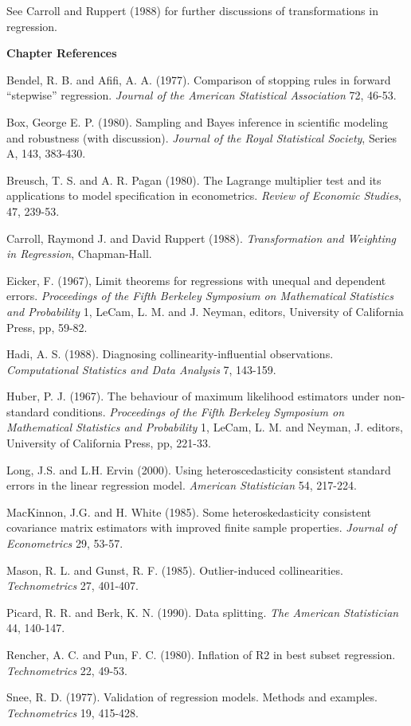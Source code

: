 See Carroll and Ruppert (1988) for further discussions of
transformations in regression.

\bigskip

\textbf{Chapter References}
\begin{multicols}{2}

Bendel, R. B. and Afifi, A. A. (1977). Comparison of stopping rules
in forward ``stepwise'' regression. \textit{Journal of the American
Statistical Association} 72, 46-53.

Box, George E. P. (1980). Sampling and Bayes inference in scientific
modeling and robustness (with discussion). \textit{Journal of the
Royal Statistical Society}, Series A, 143, 383-430.

Breusch, T. S. and A. R. Pagan (1980).  The Lagrange multiplier test
and its applications to model specification in econometrics.
\textit{Review of Economic Studies}, 47, 239-53.

Carroll, Raymond J. and David Ruppert (1988). \textit{Transformation
and Weighting in Regression}, Chapman-Hall.

Eicker, F. (1967), Limit theorems for regressions with unequal and
dependent errors.  \textit{Proceedings of the Fifth Berkeley
Symposium on Mathematical Statistics and Probability} 1, LeCam, L.
M. and J. Neyman, editors, University of California Press, pp,
59-82.

Hadi, A. S. (1988). Diagnosing collinearity-influential
observations. \textit{Computational Statistics and Data Analysis} 7,
143-159.

Huber, P. J. (1967). The behaviour of maximum likelihood estimators
under non-standard conditions. \textit{Proceedings of the Fifth
Berkeley Symposium on Mathematical Statistics and Probability} 1,
LeCam, L. M. and Neyman, J. editors, University of California Press,
pp, 221-33.

Long, J.S. and L.H. Ervin (2000). Using heteroscedasticity
consistent standard errors in the linear regression model.
\textit{American Statistician} 54, 217-224.

MacKinnon, J.G. and H. White (1985). Some heteroskedasticity
consistent covariance matrix estimators with improved finite sample
properties. \textit{Journal of Econometrics} 29, 53-57.

Mason, R. L. and Gunst, R. F. (1985). Outlier-induced
collinearities. \textit{Technometrics} 27, 401-407.

Picard, R. R. and Berk, K. N. (1990). Data splitting. \textit{The
American Statistician} 44, 140-147.

Rencher, A. C. and Pun, F. C. (1980). Inflation of R2 in best subset
regression. \textit{Technometrics} 22, 49-53.

Snee, R. D. (1977). Validation of regression models. Methods and
examples. \textit{Technometrics} 19, 415-428.


\end{multicols}
